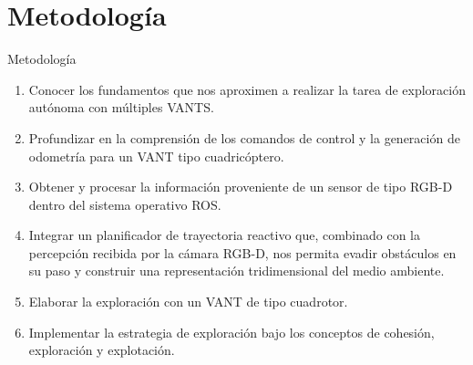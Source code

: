 \documentclass[
  24pt, %
  aspectratio=169, %
]{beamer}
\begin{document}
\section{Metodología}
\begin{frame}{Metodología}
  
  \begin{enumerate}
  \item Conocer los fundamentos que nos aproximen a realizar la tarea de exploración autónoma con múltiples VANTS.
  \item Profundizar en la comprensión de los comandos de control y la generación de odometría para un VANT tipo cuadricóptero.
  \item Obtener y procesar la información proveniente de un sensor de tipo RGB-D dentro del sistema operativo ROS.
  \item Integrar un planificador de trayectoria reactivo que, combinado con la percepción recibida por la cámara RGB-D, nos permita evadir obstáculos en su paso y construir una representación tridimensional del medio ambiente.
  \item Elaborar la exploración con un VANT de tipo cuadrotor.
  \item Implementar la estrategia de exploración bajo los conceptos de cohesión, exploración y explotación.
    
  \end{enumerate}
\end{frame}
\end{document}
